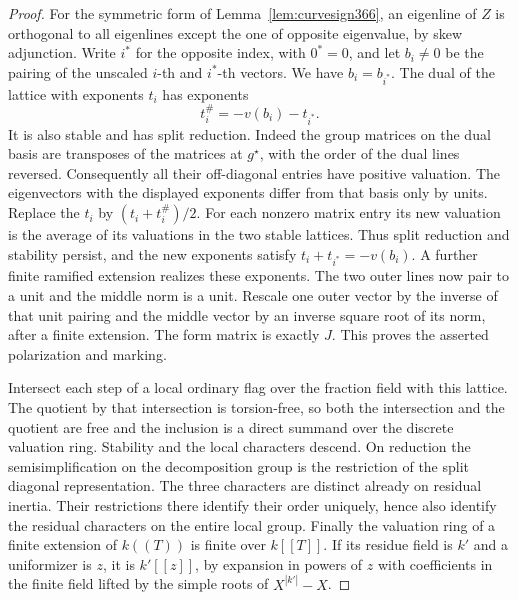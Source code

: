 \documentclass[a4paper,11pt]{article}
\theoremstyle{definition}
\theoremstyle{remark}
\numberwithin{equation}{section}
\begin{document}
\begin{proof}
For the symmetric form of Lemma~\ref{lem:curvesign366}, an
eigenline of \(Z\) is orthogonal to all eigenlines except
the one of opposite eigenvalue, by skew adjunction. Write
\(i^*\) for the opposite index, with \(0^*=0\), and let
\(b_i\ne0\) be the pairing of the unscaled \(i\)-th and
\(i^*\)-th vectors. We have \(b_i=b_{i^*}\). The dual of
the lattice with exponents \(t_i\) has exponents
\[
                   t_i^\#=-v(b_i)-t_{i^*}.
\]
It is also stable and has split reduction. Indeed the group
matrices on the dual basis are transposes of the matrices at
\(g^\star\), with the order of the dual lines reversed.
Consequently all their off-diagonal entries have positive
valuation. The eigenvectors with the displayed exponents
differ from that basis only by units. Replace the \(t_i\) by
\((t_i+t_i^\#)/2\). For each nonzero matrix entry its new
valuation is the average of its valuations in the two stable
lattices. Thus split reduction and stability persist, and the
new exponents satisfy \(t_i+t_{i^*}=-v(b_i)\). A further
finite ramified extension realizes these exponents. The two
outer lines now pair to a unit and the middle norm is a unit.
Rescale one outer vector by the inverse of that unit pairing
and the middle vector by an inverse square root of its norm,
after a finite extension. The form matrix is exactly \(J\).
This proves the asserted polarization and marking.

Intersect each step of a local ordinary flag over the fraction
field with this lattice. The quotient by that intersection is
torsion-free, so both the intersection and the quotient are
free and the inclusion is a direct summand over the discrete
valuation ring. Stability and the local characters descend.
On reduction the semisimplification on the decomposition group
is the restriction of the split diagonal representation.
The three characters are distinct already on residual inertia.
Their restrictions there identify their order uniquely, hence
also identify the residual characters on the entire local
group. Finally the valuation ring of a finite extension of
\(k((T))\) is finite over \(k[[T]]\). If its residue field
is \(k'\) and a uniformizer is \(z\), it is \(k'[[z]]\),
by expansion in powers of \(z\) with coefficients in the
finite field lifted by the simple roots of \(X^{|k'|}-X\).
\end{proof}
\end{document}
